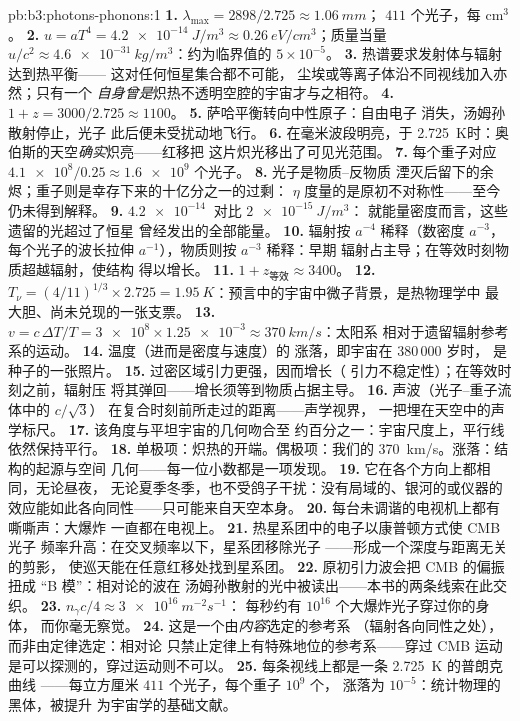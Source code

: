 \begin{solution}{pb:b3:photons-phonons:1}
\textbf{1.} $\lambda_{\max} = 2898/2.725 \approx \qty{1.06}{mm}$；
$411$ 个光子，每 cm$^3$。
\textbf{2.} $u = aT^4 = \qty{4.2e-14}{J/m^3} \approx
\qty{0.26}{eV/cm^3}$；质量当量 $u/c^2 \approx
\qty{4.6e-31}{kg/m^3}$：约为临界值的 $5\times10^{-5}$。
\textbf{3.} 热谱要求发射体与辐射达到热平衡——
这对任何恒星集合都不可能，
尘埃或等离子体沿不同视线加入亦然；只有一个
\emph{自身曾是}炽热不透明空腔的宇宙才与之相符。
\textbf{4.} $1 + z = 3000/2.725 \approx 1100$。
\textbf{5.} 萨哈平衡转向中性原子：自由电子
消失，汤姆孙散射停止，光子
此后便未受扰动地飞行。
\textbf{6.} 在毫米波段明亮，于
\qty{2.725}{K}时：奥伯斯的天空\emph{确实}炽亮——红移把
这片炽光移出了可见光范围。
\textbf{7.} 每个重子对应 $\num{4.1e8}/0.25 \approx \num{1.6e9}$
个光子。
\textbf{8.} 光子是物质–反物质
湮灭后留下的余烬；重子则是幸存下来的十亿分之一的过剩：
$\eta$ 度量的是原初不对称性——至今
仍未得到解释。
\textbf{9.} $\qty{4.2e-14}{}$ 对比 $\qty{2e-15}{J/m^3}$：
就能量密度而言，这些遗留的光超过了恒星
曾经发出的全部能量。
\textbf{10.} 辐射按 $a^{-4}$ 稀释（数密度 $a^{-3}$，
每个光子的波长拉伸 $a^{-1}$），物质则按 $a^{-3}$ 稀释：早期
辐射占主导；在等效时刻物质超越辐射，使结构
得以增长。
\textbf{11.} $1 + z_{\text{等效}} \approx 3400$。
\textbf{12.} $T_\nu = (4/11)^{1/3} \times 2.725 =
\qty{1.95}{K}$：预言中的宇宙中微子背景，是热物理学中
最大胆、尚未兑现的一张支票。
\textbf{13.} $v = c\,\Delta T/T = \num{3e8} \times \num{1.25e-3}
\approx \qty{370}{km/s}$：太阳系
相对于遗留辐射参考系的运动。
\textbf{14.} 温度（进而是密度与速度）的
涨落，即宇宙在 380\,000 岁时，
是种子的一张照片。
\textbf{15.} 过密区域引力更强，因而增长（
引力不稳定性）；在等效时刻之前，辐射压
将其弹回——增长须等到物质占据主导。
\textbf{16.} 声波（光子–重子流体中的 $c/\sqrt3$）
在复合时刻前所走过的距离——声学视界，
一把埋在天空中的声学标尺。
\textbf{17.} 该角度与平坦宇宙的几何吻合至
约百分之一：宇宙尺度上，平行线依然保持平行。
\textbf{18.} 单极项：炽热的开端。偶极项：我们的
\qty{370}{km/s}。涨落：结构的起源与空间
几何——每一位小数都是一项发现。
\textbf{19.} 它在各个方向上都相同，无论昼夜，
无论夏季冬季，也不受鸽子干扰：没有局域的、银河的或仪器的
效应能如此各向同性——只可能来自天空本身。
\textbf{20.} 每台未调谐的电视机上都有嘶嘶声：大爆炸
一直都在电视上。
\textbf{21.} 热星系团中的电子以康普顿方式使 CMB 光子
频率升高：在交叉频率以下，星系团移除光子
——形成一个深度与距离无关的剪影，
使巡天能在任意红移处找到星系团。
\textbf{22.} 原初引力波会把 CMB 的偏振扭成
“B 模”：相对论的波在
汤姆孙散射的光中被读出——本书的两条线索在此交织。
\textbf{23.} $n_\gamma c/4 \approx \qty{3e16}{m^{-2}s^{-1}}$：
每秒约有 $10^{16}$ 个大爆炸光子穿过你的身体，
而你毫无察觉。
\textbf{24.} 这是一个由\emph{内容}选定的参考系
（辐射各向同性之处），而非由定律选定：相对论
只禁止定律上有特殊地位的参考系——穿过 CMB 运动
是可以探测的，穿过运动则不可以。
\textbf{25.} 每条视线上都是一条 \qty{2.725}{K} 的普朗克曲线
——每立方厘米 $411$ 个光子，每个重子 $10^9$ 个，
涨落为 $10^{-5}$：统计物理的黑体，被提升
为宇宙学的基础文献。
\end{solution}
